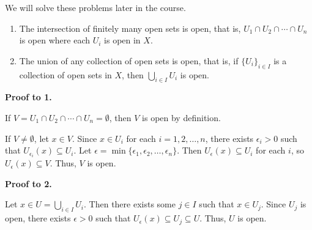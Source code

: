 \documentclass[main.tex]{subfiles}
\begin{document}
\par We will solve these problems later in the course.

\begin{theorem} 
    \begin{enumerate}
        \item The intersection of finitely many open sets is open, that is, $U_1 \cap U_2 \cap \cdots \cap U_n$ is open where each $U_i$ is open in $X$. 
        \item The union of any collection of open sets is open, that is, if $\{U_i\}_{i \in I}$ is a collection of open sets in $X$, then $\bigcup_{i \in I} U_i$ is open.
    \end{enumerate}
\end{theorem}

\par \noindent \textbf{Proof to 1.} 
\par If $V = U_1 \cap U_2 \cap \cdots \cap U_n = \emptyset$, then $V$ is open by definition.
\par If $V \neq \emptyset$, let $x \in V$. Since $x \in U_i$ for each $i = 1, 2, \ldots, n$, there exists $\epsilon_i > 0$ such that $U_{\epsilon_i} (x) \subseteq U_i$. Let $\epsilon = \min\{\epsilon_1, \epsilon_2, \ldots, \epsilon_n\}$. Then $U_{\epsilon} (x) \subseteq U_i$ for each $i$, so $U_{\epsilon} (x) \subseteq V$. Thus, $V$ is open.
\par \noindent \textbf{Proof to 2.}
\par Let $x \in U = \bigcup_{i \in I} U_i$. Then there exists some $j \in I$ such that $x \in U_j$. Since $U_j$ is open, there exists $\epsilon > 0$ such that $U_{\epsilon} (x) \subseteq U_j \subseteq U$. Thus, $U$ is open. 
\end{document}
